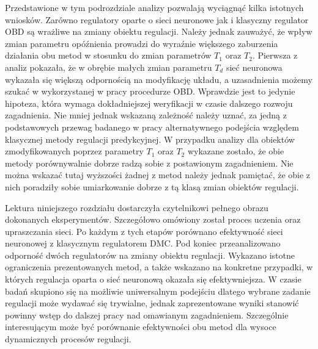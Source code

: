 \par Przedstawione w tym podrozdziale analizy pozwalają wyciągnąć kilka istotnych wniosków. Zarówno regulatory oparte o sieci neuronowe jak i klasyczny regulator OBD są wrażliwe na zmiany obiektu regulacji. Należy jednak zauważyć, że wpływ zmian parametru opóźnienia prowadzi do wyraźnie większego zaburzenia działania obu metod w stosunku do zmian parametrów \(T_1 \) oraz \(T_2\). Pierwsza z analiz pokazała, że w obrębie małych zmian parametru \(T_d\) sieć neuronowa wykazała się większą odpornością na modyfikację układu, a uzasadnienia możemy szukać w wykorzystanej w pracy procedurze OBD. Wprawdzie jest to jedynie hipoteza, która wymaga dokładniejszej weryfikacji w czasie dalszego rozwoju zagadnienia. Nie mniej jednak wskazaną zależność należy uznać, za jedną z podstawowych przewag badanego w pracy alternatywnego podejścia względem klasycznej metody regulacji predykcyjnej. W przypadku analizy dla obiektów zmodyfikowanych poprzez parametry \(T_1 \) oraz \(T_2\) wykazane zostało, że obie metody porównywalnie dobrze radzą sobie z postawionym zagadnieniem. Nie można wskazać tutaj wyższości żadnej z metod należy jednak pamiętać, że obie z nich poradziły sobie umiarkowanie dobrze z tą klasą zmian obiektów regulacji.
\par Lektura niniejszego rozdziału dostarczyła czytelnikowi pełnego obrazu dokonanych eksperymentów. Szczegółowo omówiony został proces uczenia oraz upraszczania sieci. Po każdym z tych etapów porównano efektywność sieci neuronowej z klasycznym regulatorem DMC. Pod koniec przeanalizowano odporność dwóch regulatorów na zmiany obiektu regulacji. Wykazano istotne ograniczenia prezentowanych metod, a także wskazano na konkretne przypadki, w których regulacja oparta o sieć neuronową okazała się efektywniejsza. W czasie badań skupiono się na możliwie uniwersalnym podejściu dlatego wybrane zadanie regulacji może wydawać się trywialne, jednak zaprezentowane wyniki stanowić powinny wstęp do dalszej pracy nad omawianym zagadnieniem. Szczególnie interesującym może być porównanie efektywności obu metod dla wysoce dynamicznych procesów regulacji.  
